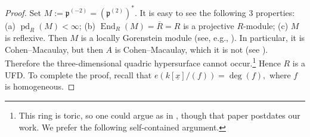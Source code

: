\documentclass[11pt,a4paper]{amsart}
\numberwithin{equation}{section}
\theoremstyle{definition}
\theoremstyle{remark}
\begin{document}
\begin{proof}
	Set \(M := \mathfrak p^{(-2)} = (\mathfrak p^{(2)})^\ast\). It is easy to see the following 3 properties:
(a)  \(\operatorname{pd}_R(M) < \infty\);
(b)   \(\operatorname{End}_R(M) = \overline{R} = R\) is a projective \(R\)-module;
 (c)  \(M\) is reflexive.
Then \(M\) is a locally Gorenstein module (see, e.g., \cite[Fact 3.5]{ufd}). In particular, it is Cohen--Macaulay, but then \(A\) is Cohen--Macaulay, which it is not (see \cite[Example 2]{Rob}).
	Therefore the three-dimensional quadric hypersurface cannot occur.\footnote{This ring is toric, so one could argue as in \cite{MP}, though that paper postdates our work. We prefer the following self-contained argument.} Hence \(R\) is a UFD.
	To complete the proof, recall that
	\(
	e(k[\underline{x}]/(f)) = \deg(f),
	\)
	where \(f\) is homogeneous.
\end{proof}
\end{document}
